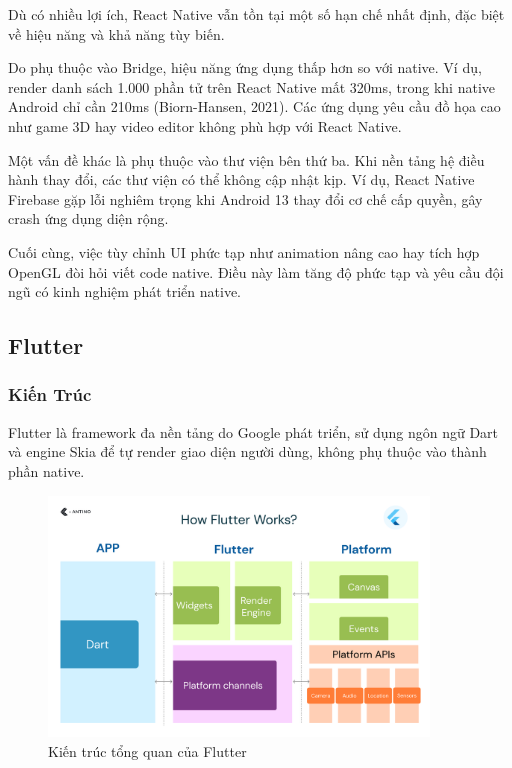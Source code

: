 \hspace*{1.5em}Dù có nhiều lợi ích, React Native vẫn tồn tại một số hạn chế nhất định, đặc biệt về hiệu năng và khả năng tùy biến.

Do phụ thuộc vào Bridge, hiệu năng ứng dụng thấp hơn so với native.  
Ví dụ, render danh sách 1.000 phần tử trên React Native mất 320ms, trong khi native Android chỉ cần 210ms (Biorn-Hansen, 2021).  
Các ứng dụng yêu cầu đồ họa cao như game 3D hay video editor không phù hợp với React Native.

Một vấn đề khác là phụ thuộc vào thư viện bên thứ ba.  
Khi nền tảng hệ điều hành thay đổi, các thư viện có thể không cập nhật kịp.  
Ví dụ, React Native Firebase gặp lỗi nghiêm trọng khi Android 13 thay đổi cơ chế cấp quyền, gây crash ứng dụng diện rộng.

Cuối cùng, việc tùy chỉnh UI phức tạp như animation nâng cao hay tích hợp OpenGL đòi hỏi viết code native.  
Điều này làm tăng độ phức tạp và yêu cầu đội ngũ có kinh nghiệm phát triển native.

\subsection{Flutter}
\renewcommand{\labelitemi}{--}    
\subsubsection{Kiến Trúc}

\hspace*{1.5em}Flutter là framework đa nền tảng do Google phát triển, sử dụng ngôn ngữ Dart và engine Skia để tự render giao diện người dùng, không phụ thuộc vào thành phần native.

\begin{figure}[H]
    \centering
    \includegraphics[width=0.9\textwidth]{images/flutter.png}
    \caption{Kiến trúc tổng quan của Flutter}
\end{figure}

